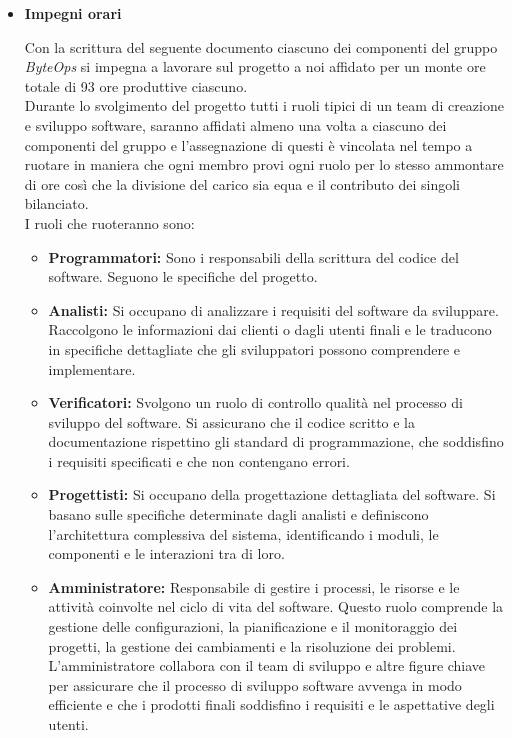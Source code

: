 \documentclass{article}
\begin{document}
\begin{itemize}
    \item[] \textbf{\fontsize{12}{6}\selectfont Impegni orari}
    
    Con la scrittura del seguente documento ciascuno dei componenti del gruppo \textit{ByteOps} si impegna a lavorare sul progetto a noi affidato per un monte ore totale di 93 ore produttive ciascuno. \\
    Durante lo svolgimento del progetto tutti i ruoli tipici di un team di creazione e sviluppo software, saranno affidati almeno una volta a ciascuno dei componenti del gruppo e  l’assegnazione di questi è vincolata nel tempo a ruotare in maniera che ogni membro provi ogni ruolo per lo stesso ammontare di ore così che la divisione del carico sia equa e il contributo dei singoli bilanciato. \\
    I ruoli che ruoteranno sono:
    \begin{itemize}
        \item \textbf{Programmatori:} Sono i responsabili della scrittura del codice del software. Seguono le specifiche del progetto.
        
        \item \textbf{Analisti:} Si occupano di analizzare i requisiti del software da sviluppare. Raccolgono le informazioni dai clienti o dagli utenti finali e le traducono in specifiche dettagliate che gli sviluppatori possono comprendere e implementare.
        
        \item \textbf{Verificatori:} Svolgono un ruolo di controllo qualità nel processo di sviluppo del software. Si assicurano che il codice scritto e la documentazione rispettino gli standard di programmazione, che soddisfino i requisiti specificati e che non contengano errori.
        
        \item \textbf{Progettisti:} Si occupano della progettazione dettagliata del software. Si basano sulle specifiche determinate dagli analisti e definiscono l'architettura complessiva del sistema, identificando i moduli, le componenti e le interazioni tra di loro.

        \item \textbf{Amministratore:} Responsabile di gestire i processi, le risorse e le attività coinvolte nel ciclo di vita del software. Questo ruolo comprende la gestione delle configurazioni, la pianificazione e il monitoraggio dei progetti, la gestione dei cambiamenti e la risoluzione dei problemi. L'amministratore collabora con il team di sviluppo e altre figure chiave per assicurare che il processo di sviluppo software avvenga in modo efficiente e che i prodotti finali soddisfino i requisiti e le aspettative degli utenti.
        

\end{itemize}
\end{itemize}
\end{document}
